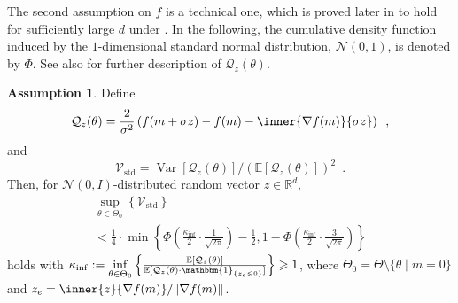 \documentclass[journal]{IEEEtran}
\DeclareMathOperator{\Var}{Var}   %
\providecommand{\R}{\mathbb{R}} %
\providecommand{\E}{\mathbb{E}} %
\providecommand{\ind}[1]{\ensuremath{\mathbbm{1}_{\left\{#1\right\}}}} %
\renewcommand{\geq}{\geqslant} %
\renewcommand{\leq}{\leqslant} %
\DeclarePairedDelimiter{\norm}{\lVert}{\rVert}
\theoremstyle{definition}
\newtheorem{assumption}[]{Assumption}
\begin{document}
\providecommand{\Thetazero}{\Theta_{0}}
The second assumption on $f$ is a technical one, which is proved later in  to hold for sufficiently large $d$ under .
In the following, the cumulative density function induced by the $1$-dimensional standard normal distribution, $\mathcal{N}(0, 1)$, is denoted by $\Phi$. 
{See also  for further description of $\mathcal{Q}_z(\theta)$.}
\begin{assumption}\label{asm:tr_cond}
Define
\begin{equation}
\mathcal{Q}_z(\theta) = \frac{2}{\sigma^2} \left(f(m + \sigma z) - f(m) - \inner{\nabla f(m)}{ \sigma z} \right) \enspace,\label{eq:q-def}
\end{equation}
and
\begin{equation}
    \mathcal{V}_\mathrm{std} = 
    \Var[\mathcal{Q}_z(\theta)]/(\E[\mathcal{Q}_z(\theta)])^2
    \enspace.
\end{equation}
Then, for $\mathcal{N}(0, I)$-distributed random vector $z \in \R^d$, 
\begin{multline}
\underset{\theta\in\Thetazero}{\sup}
\left\{\mathcal{V}_\mathrm{std}  \right\}
\\
< \frac14 \cdot \min \left\{ \Phi\left(\frac{\kappa_{\inf}}{2}\cdot\frac{1}{\sqrt{2\pi}}\right) - \frac12 , 1 - \Phi\left( \frac{\kappa_{\inf}}{2}\cdot\frac{3}{\sqrt{2\pi}}\right)\right\} 
\label{eq:tr_cond}
\end{multline}
holds with $\kappa_{\inf} := 
\underset{\theta\in\Thetazero}{\inf}
\left\{\frac{\E[\mathcal{Q}_z(\theta)]}{\E[\mathcal{Q}_z(\theta)\cdot\ind{z_e\leq 0}]}\right\} \geq 1$, where $\Thetazero = \Theta \setminus \{\theta \mid m = 0\}$ and $z_e = \inner{z}{\nabla f(m)}/\norm{\nabla f(m)}$.
\end{assumption}
\end{document}
